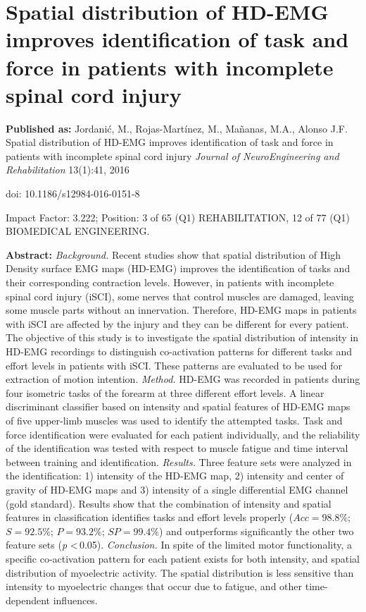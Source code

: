 \chapter[Myoelectric patterns for task identification in patients with iSCI]{Spatial distribution of HD-EMG improves identification of task and force in patients with incomplete spinal cord injury }
\label{ch:p1}
\textbf{Published as:} 
Jordanić, M., Rojas-Martínez, M., Ma\~nanas, M.A., Alonso J.F.
Spatial distribution of HD-EMG improves identification of task and force in patients with incomplete spinal cord injury \textit{Journal of NeuroEngineering and Rehabilitation} 13(1):41, 2016

doi: 10.1186/s12984-016-0151-8

Impact Factor: 3.222; Position: 3 of 65 (Q1) REHABILITATION, 12 of 77 (Q1) BIOMEDICAL ENGINEERING.


\textbf{Abstract:} \textit{Background.} Recent studies show that spatial distribution of High Density surface EMG maps (HD-EMG) improves the identification of tasks and their corresponding contraction levels. However, in patients with incomplete spinal cord injury (iSCI), some nerves that control muscles are damaged, leaving some muscle parts without an innervation.
Therefore, HD-EMG maps in patients with iSCI are affected by the injury and they can be different for every patient.
The objective of this study is to investigate the spatial distribution of intensity in HD-EMG recordings to distinguish
co-activation patterns for different tasks and effort levels in patients with iSCI. These patterns are evaluated to be used
for extraction of motion intention. \textit{Method.} HD-EMG was recorded in patients during four isometric tasks of the forearm at three different effort levels. A linear discriminant classifier based on intensity and spatial features of HD-EMG maps of five upper-limb muscles was used to identify the attempted tasks. Task and force identification were evaluated for each patient individually,
and the reliability of the identification was tested with respect to muscle fatigue and time interval between training and identification. \textit{Results.} Three feature sets were analyzed in the identification: 1) intensity of the HD-EMG map, 2) intensity and center of gravity of HD-EMG maps and 3) intensity of a single differential EMG channel (gold standard). Results show that the combination of intensity and spatial features in classification identifies tasks and effort levels properly ($Acc=98.8\%$; $S = 92.5\%$; $P = 93.2\%$; $SP = 99.4\%$) and outperforms significantly the other two feature sets (\textit{p} \textless \,0.05). \textit{Conclusion.} In spite of the limited motor functionality, a specific co-activation pattern for each patient exists for both intensity, and spatial distribution of myoelectric activity. The spatial distribution is less sensitive than intensity to myoelectric changes that occur due to fatigue, and other time-dependent influences.

